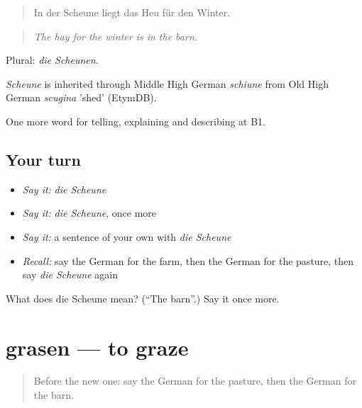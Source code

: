 \begin{quote}
In der Scheune liegt das Heu für den Winter.
\end{quote}

\begin{quote}
\emph{The hay for the winter is in the barn.}
\end{quote}

Plural: \emph{die Scheunen}.

\begin{cousinweb}
\emph{Scheune} is inherited through Middle High German \emph{schiune} from Old High German \emph{scugina} 'shed' (EtymDB).
\end{cousinweb}

\begin{grammarlens}[title={What you've built}]
One more word for telling, explaining and describing at B1.
\end{grammarlens}

\subsection*{Your turn}
\begin{itemize}
\raggedright
  \item \emph{Say it:} \emph{die Scheune}
  \item \emph{Say it:} \emph{die Scheune}, once more
  \item \emph{Say it:} a sentence of your own with \emph{die Scheune}
  \item \emph{Recall:} say the German for the farm, then the German for the pasture, then say \emph{die Scheune} again
\end{itemize}

\begin{tcolorbox}[breakable,colback=teal!4,colframe=teal!35!black,title={Before you move on}]
What does die Scheune mean? (\textquotedblleft{}The barn\textquotedblright{}.) Say it once more.
\end{tcolorbox}
\section[grasen]{grasen — to graze}

\label{lesson:GE-C459-grasen}



\begin{quote}
Before the new one: say the German for the pasture, then the German for the barn.
\end{quote}

